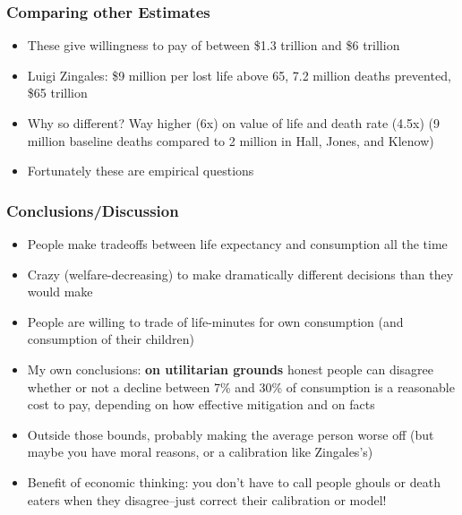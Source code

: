 \documentclass{beamer}
\begin{document}
\begin{frame}
\frametitle[alignment=center]{Comparing other Estimates}
\begin{itemize}
\item These give willingness to pay of between \$1.3 trillion and \$6 trillion
\bigskip
\item Luigi Zingales: \$9 million per lost life above 65, 7.2 million deaths prevented, \$65 trillion
\bigskip
\item Why so different?  Way higher (6x) on value of life and death rate (4.5x) (9 million baseline deaths compared to 2 million in Hall, Jones, and Klenow)
\bigskip
\item Fortunately these are empirical questions
\end{itemize}
\end{frame}



\begin{frame}
\frametitle[alignment=center]{Conclusions/Discussion}
\begin{itemize}
\item People make tradeoffs between life expectancy and consumption all the time
\smallskip
\item Crazy (welfare-decreasing) to make dramatically different decisions than they would make
\smallskip
\item People are willing to trade of life-minutes for own consumption (and consumption of their children)
\smallskip
 \item My own conclusions: \textbf{on utilitarian grounds} honest people can disagree whether or not a decline between 7\% and 30\% of consumption is a reasonable cost to pay, depending on how effective mitigation and on facts
 \smallskip
 \item Outside those bounds, probably making the average person worse off (but maybe you have moral reasons, or a calibration like Zingales's)
 \smallskip
  \item Benefit of economic thinking: you don't have to call people ghouls or death eaters when they disagree--just correct their calibration or model!
\end{itemize}
\end{frame}
\end{document}
